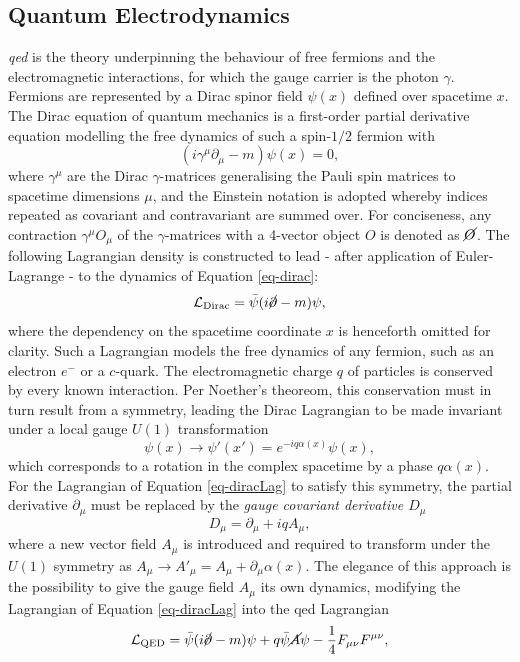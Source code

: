\subsection{Quantum Electrodynamics}\label{subsec-QED}
\textit{\gls{qed}} is the theory underpinning the behaviour of free fermions and the electromagnetic interactions, for which the gauge carrier is the photon $\gamma$. Fermions are represented by a Dirac spinor field $\psi(x)$ defined over spacetime $x$. The Dirac equation of quantum mechanics is a first-order partial derivative equation modelling the free dynamics of such a spin-$1/2$ fermion with
\begin{equation}\label{eq-dirac}
    (i\gamma^{\mu} \partial_{\mu} - m) \psi(x) = 0,
\end{equation}
where $\gamma^{\mu}$ are the Dirac $\gamma$-matrices generalising the Pauli spin matrices to spacetime dimensions $\mu$, and the Einstein notation is adopted whereby indices repeated as covariant and contravariant are summed over. For conciseness, any contraction $\gamma^{\mu} O_{\mu}$ of the $\gamma$-matrices with a 4-vector object $O$ is denoted as $\cancel{O}$. The following Lagrangian density is constructed to lead - after application of Euler-Lagrange - to the dynamics of Equation \ref{eq-dirac}:
\begin{equation}\label{eq-diracLag}
   \mathcal{L}_{\text{Dirac}} = \bar{\psi} (i \cancel{\partial}- m) \psi,
\end{equation}
where the dependency on the spacetime coordinate $x$ is henceforth omitted for clarity. Such a Lagrangian models the free dynamics of any fermion, such as an electron $e^-$ or a $c$-quark. The electromagnetic charge $q$ of particles is conserved by every known interaction. Per Noether's theoreom, this conservation must in turn result from a symmetry, leading the Dirac Lagrangian to be made invariant under a local gauge $U(1)$ transformation
\begin{equation}\label{eq-GaugeU1}
    \psi(x) \rightarrow \psi'(x') = e^{-iq\alpha(x)} \psi(x),
\end{equation}
which corresponds to a rotation in the complex spacetime by a phase $q\alpha(x)$. For the Lagrangian of Equation \ref{eq-diracLag} to satisfy this symmetry, the partial derivative $\partial_{\mu}$ must be replaced by the \textit{gauge covariant derivative $D_{\mu}$}
\begin{equation}\label{eq-CoDerU1}
    D_{\mu} = \partial_{\mu} + iqA_{\mu},
\end{equation}
where a new vector field $A_{\mu}$ is introduced and required to transform under the $U(1)$ symmetry as $A_{\mu} \rightarrow A'_{\mu} = A_{\mu} + \partial_{\mu} \alpha(x)$. The elegance of this approach is the possibility to give the gauge field $A_{\mu}$ its own dynamics, modifying the Lagrangian of Equation \ref{eq-diracLag} into the \gls{qed} Lagrangian \[ \mathcal{L}_{\text{QED}} = \bar{\psi} (i \cancel{\partial}- m) \psi + q \bar{\psi} \cancel{A} \psi - \frac{1}{4} F_{\mu\nu} F^{\mu\nu}, \]
